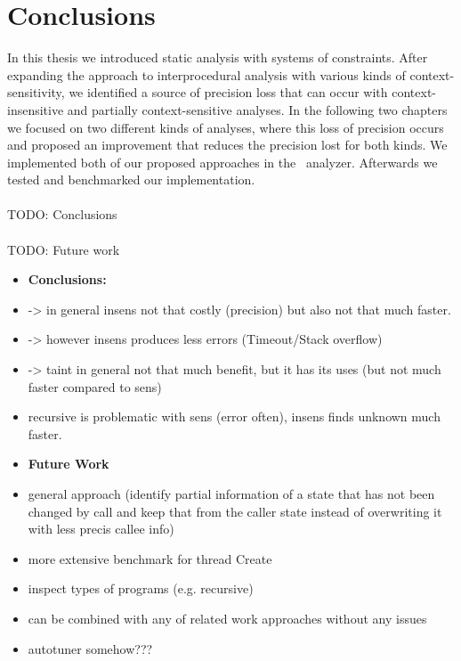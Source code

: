 
\chapter{Conclusions}\label{chapter:conclusions}
  In this thesis we introduced static analysis with systems of constraints. After expanding the approach to interprocedural analysis with various kinds of context-sensitivity, we identified a source of precision loss that can occur with context-insensitive and partially context-sensitive analyses. In the following two chapters we focused on two different kinds of analyses, where this loss of precision occurs and proposed an improvement that reduces the precision lost for both kinds. We implemented both of our proposed approaches in the \gob\ analyzer. Afterwards we tested and benchmarked our implementation.\\
  \\
  TODO: Conclusions\\
  \\
  TODO: Future work

\begin{itemize}
  \item \textbf{Conclusions:}
  \item -> in general insens not that costly (precision) but also not that much faster.
  \item -> however insens produces less errors (Timeout/Stack overflow)
  \item -> taint in general not that much benefit, but it has its uses (but not much faster compared to sens)
  \item recursive is problematic with sens (error often), insens finds unknown much faster.
  \item \textbf{Future Work}
  \item general approach (identify partial information of a state that has not been changed by call and keep that from the caller state instead of overwriting it with less precis callee info)
  \item more extensive benchmark for thread Create
  \item inspect types of programs (e.g. recursive)
  \item can be combined with any of related work approaches without any issues
  \item autotuner somehow???
\end{itemize}

